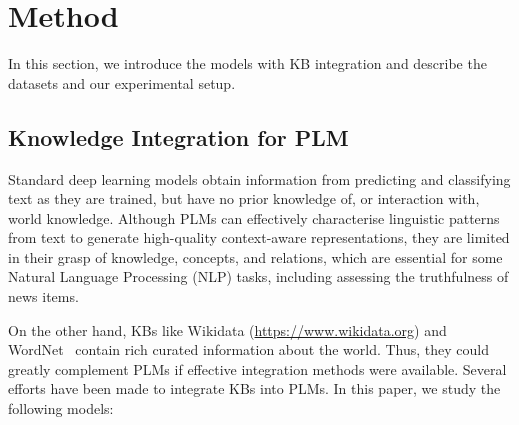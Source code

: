 \documentclass[letterpaper]{article} %
\begin{document}
\section{Method}

In this section, we introduce the models with KB integration and describe the datasets and our experimental setup. 

\subsection{Knowledge Integration for PLM}
Standard deep learning models obtain information from predicting and classifying text as they are trained, but have no prior knowledge of, or interaction with, world knowledge. 
Although PLMs can effectively characterise linguistic patterns from text to generate high-quality context-aware representations, they are limited in their grasp of knowledge, concepts, and relations, which are essential for some Natural Language Processing (NLP) tasks, including assessing the truthfulness of news items.

On the other hand, KBs like Wikidata (\url{https://www.wikidata.org}) and WordNet~\cite{Miller1995WordNetAL} contain rich curated information about the world. 
Thus, they could greatly complement PLMs if effective integration methods were available. 
Several efforts have been made to integrate KBs into PLMs. 
In this paper, we study the following models: 


\end{document}
